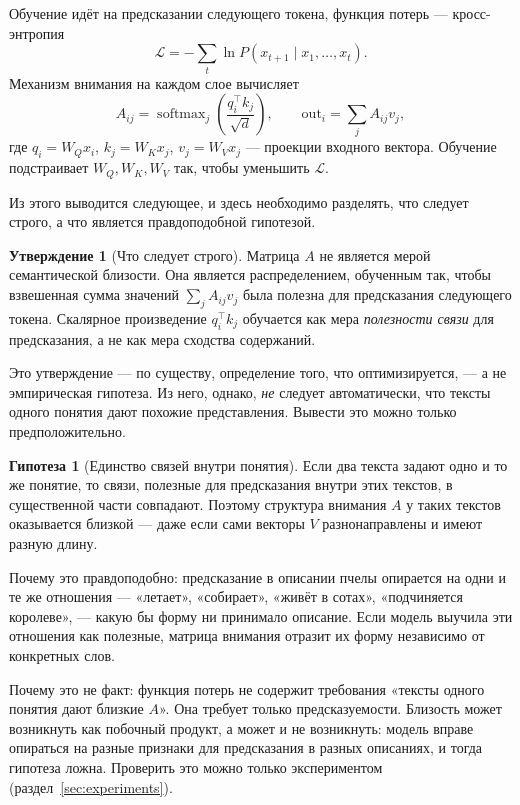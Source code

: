 \documentclass[11pt,a4paper]{article}
\theoremstyle{definition}
\newtheorem{hypothesis}[definition]{Гипотеза}
\newtheorem{proposition}[definition]{Утверждение}
\theoremstyle{plain}
\DeclareMathOperator{\softmax}{softmax}
\begin{document}
Обучение идёт на предсказании следующего токена, функция потерь — кросс-энтропия
\[
\mathcal{L}=-\sum_t \ln P(x_{t+1}\mid x_1,\dots,x_t).
\]
Механизм внимания на каждом слое вычисляет
\begin{equation}\label{eq:attn}
A_{ij}=\softmax_j\!\left(\frac{q_i^\top k_j}{\sqrt d}\right),\qquad
\mathrm{out}_i=\sum_j A_{ij}v_j ,
\end{equation}
где $q_i=W_Q x_i$, $k_j=W_K x_j$, $v_j=W_V x_j$ — проекции входного вектора. Обучение
подстраивает $W_Q,W_K,W_V$ так, чтобы уменьшить $\mathcal{L}$.

Из этого выводится следующее, и здесь необходимо разделять, что следует строго, а что
является правдоподобной гипотезой.

\begin{proposition}[Что следует строго]\label{prop:strict}
Матрица $A$ не является мерой семантической близости. Она является распределением, обученным
так, чтобы взвешенная сумма значений $\sum_j A_{ij}v_j$ была полезна для предсказания
следующего токена. Скалярное произведение $q_i^\top k_j$ обучается как мера
\emph{полезности связи} для предсказания, а не как мера сходства содержаний.
\end{proposition}

Это утверждение — по существу, определение того, что оптимизируется, — а не эмпирическая
гипотеза. Из него, однако, \emph{не} следует автоматически, что тексты одного понятия дают
похожие представления. Вывести это можно только предположительно.

\begin{hypothesis}[Единство связей внутри понятия]\label{hyp:training}
Если два текста задают одно и то же понятие, то связи, полезные для предсказания внутри этих
текстов, в существенной части совпадают. Поэтому структура внимания $A$ у таких текстов
оказывается близкой — даже если сами векторы $V$ разнонаправлены и имеют разную длину.
\end{hypothesis}

Почему это правдоподобно: предсказание в описании пчелы опирается на одни и те же отношения —
«летает», «собирает», «живёт в сотах», «подчиняется королеве», — какую бы форму ни принимало
описание. Если модель выучила эти отношения как полезные, матрица внимания отразит их форму
независимо от конкретных слов.

Почему это не факт: функция потерь не содержит требования «тексты одного понятия дают близкие
$A$». Она требует только предсказуемости. Близость может возникнуть как побочный продукт, а
может и не возникнуть: модель вправе опираться на разные признаки для предсказания в разных
описаниях, и тогда гипотеза ложна. Проверить это можно только экспериментом
(раздел~\ref{sec:experiments}).
\end{document}

